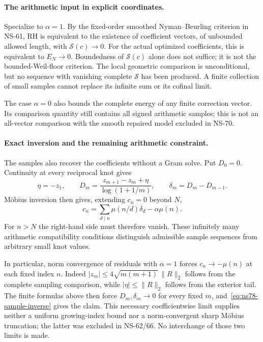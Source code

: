 \paragraph{The arithmetic input in explicit coordinates.}
Specialize to $\alpha=1$. By the fixed-order smoothed Nyman--Beurling
criterion in NS-61, RH is
equivalent to the existence of coefficient vectors, of unbounded allowed
length, with $\mathcal S(c)\to0$. For the actual optimized coefficients,
this is equivalent to $E_N\to0$. Boundedness of $\mathcal S(c)$ alone
does not suffice; it is not the bounded-Weil-floor criterion.
The local geometric comparison is unconditional, but no sequence with
vanishing complete $\mathcal S$ has been produced. A finite collection
of small samples cannot replace its infinite sum or its cofinal limit.

The case $\alpha=0$ also bounds the complete energy of any finite
correction vector. Its comparison quantity still contains all signed
arithmetic samples; this is not an all-vector comparison with the
smooth repaired model excluded in NS-70.

\paragraph{Exact inversion and the remaining arithmetic constraint.}
The samples also recover the coefficients without a Gram solve. Put
$D_0=0$. Continuity at every reciprocal knot gives
\[
 \eta=-z_1,\qquad
 D_m=\frac{z_{m+1}-z_m+\eta}{\log(1+1/m)},\qquad
 \delta_m=D_m-D_{m-1}.
\]
M\"obius inversion then gives, extending $c_n=0$ beyond $N$,
\begin{equation}
 c_n=\sum_{d\mid n}\mu(n/d)\delta_d-\alpha\mu(n).
 \label{eq:ns78-sample-inverse}
\end{equation}
For $n>N$ the right-hand side must therefore vanish. These infinitely
many arithmetic compatibility conditions distinguish admissible sample
sequences from arbitrary small knot values.

In particular, norm convergence of residuals with $\alpha=1$ forces
$c_n\to-\mu(n)$ at each fixed index $n$. Indeed
$|z_m|\leq4\sqrt{m(m+1)}\,\|R\|_2$ follows from the complete
sampling comparison, while $|\eta|\leq\|R\|_2$ follows from the
exterior tail. The finite formulas above then force $D_m,\delta_m\to0$
for every fixed $m$, and~\eqref{eq:ns78-sample-inverse} gives the claim.
This necessary coefficientwise limit supplies neither a uniform growing-index
bound nor a norm-convergent sharp M\"obius truncation; the latter was
excluded in NS-62/66. No interchange of those two limits is made.

